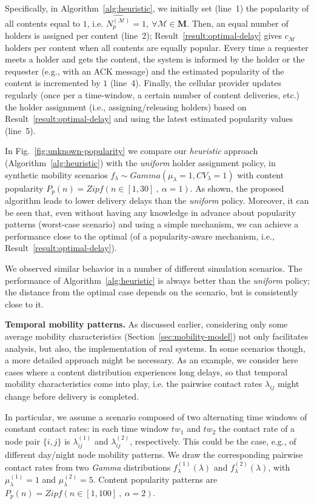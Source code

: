 \documentclass[journal]{IEEEtran}
\newcommand{\Np}{N_{p}^{(\mathcal{M})}}
\newcommand{\revisionRed}[1]{{#1}}\newcommand{\red}[1]{{#1}}
\begin{document}
\revisionRed{
Specifically, in Algorithm~\ref{alg:heuristic}, we initially set (line~1) the popularity of all contents equal to $1$, i.e. $\widehat{\Np}=1,~\forall\mathcal{M}\in\textbf{M}$. Then, an equal number of holders is assigned per content (line~2); Result~\ref{result:optimal-delay} gives $c_{\mathcal{M}}$ holders per content when all contents are equally popular. Every time a requester meets a holder and gets the content, the system is informed by the holder or the requester (e.g., with an ACK message) and the estimated popularity of the content is incremented by $1$ (line~4). Finally, the cellular provider updates regularly (once per a time-window, a certain number of content deliveries, etc.) the holder assignment (i.e., assigning/releasing holders) based on Result~\ref{result:optimal-delay} and using the latest estimated popularity values (line~5).
}

\revisionRed{
In Fig.~\ref{fig:unknown-popularity} we compare our \textit{heuristic} approach (Algorithm~\ref{alg:heuristic}) with the \textit{uniform} holder assignment policy, in synthetic mobility scenarios $f_{\lambda}\sim Gamma (\mu_{\lambda}=1, CV_{\lambda}=1)$ with content popularity $P_{p}(n) = Zipf(n\in[1,30]~,~\alpha = 1)$. As shown, the proposed algorithm leads to lower delivery delays than the \textit{uniform} policy. Moreover, it can be seen that, even without having any knowledge in advance about popularity patterns (worst-case scenario) and using a simple mechanism, we can achieve a performance close to the optimal (of a popularity-aware mechanism, i.e., Result~\ref{result:optimal-delay}). 
}

\revisionRed{
We observed similar behavior in a number of different simulation scenarios. The performance of Algorithm~\ref{alg:heuristic} is always better than the \textit{uniform} policy; the distance from the optimal case depends on the scenario, but is consistently close to it.
}


\revisionRed{
\textbf{Temporal mobility patterns.} As discussed earlier, considering only some average mobility characteristics (Section~\ref{sec:mobility-model}) not only facilitates analysis, but also, the implementation of real systems. In some scenarios though, a more detailed approach might be necessary. As an example, we consider here cases where a content distribution experiences long delays, so that temporal mobility characteristics come into play, i.e. the pairwise contact rates $\lambda_{ij}$ might change before delivery is completed. 
}

\revisionRed{
In particular, we assume a scenario composed of two alternating time windows of constant contact rates: in each time window $tw_{1}$ and $tw_{2}$ the contact rate of a node pair $\{i,j\}$ is $\lambda_{ij}^{(1)}$ and $\lambda_{ij}^{(2)}$, respectively. This could be the case, e.g., of different day/night node mobility patterns. We draw the corresponding pairwise contact rates from two \textit{Gamma} distributions $f_{\lambda}^{(1)}(\lambda)$ and $f_{\lambda}^{(2)}(\lambda)$, with $\mu_{\lambda}^{(1)}=1$ and $\mu_{\lambda}^{(2)}=5$. Content popularity patterns are $P_{p}(n) = Zipf(n\in[1,100]~,~\alpha = 2)$.
}
\end{document}
